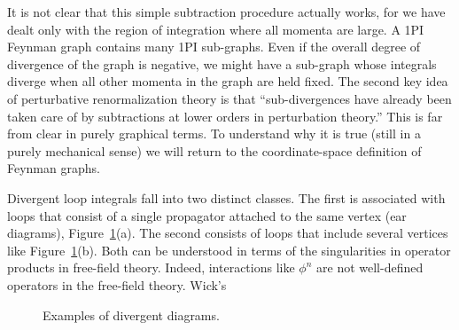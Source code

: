 It is not clear that this simple subtraction procedure actually works, for we
have dealt only with the region of integration where all momenta are large. A
1PI Feynman graph contains many 1PI sub-graphs. Even if the overall degree of
divergence of the graph is negative, we might have a sub-graph whose integrals
diverge when all other momenta in the graph are held fixed. The second key idea
of perturbative renormalization theory is that ``sub-divergences have already
been taken care of by subtractions at lower orders in perturbation theory.''
This is far from clear in purely graphical terms. To understand why it is
true (still in a purely mechanical sense) we will return to the coordinate-space
definition of Feynman graphs.

Divergent loop integrals fall into two distinct classes. The first is
associated with loops that consist of a single propagator attached to the same
vertex (ear diagrams), Figure~\ref{fig:9.1}(a). The second consists of loops
that include several vertices like Figure~\ref{fig:9.1}(b). Both can be
understood in terms of the singularities in operator products in free-field
theory. Indeed, interactions like $\phi^n$ are not well-defined operators in
the free-field theory. Wick's

\begin{figure}[htbp]
  \centering
  
  \caption{Examples of divergent diagrams.}
  \label{fig:9.1}
\end{figure}

